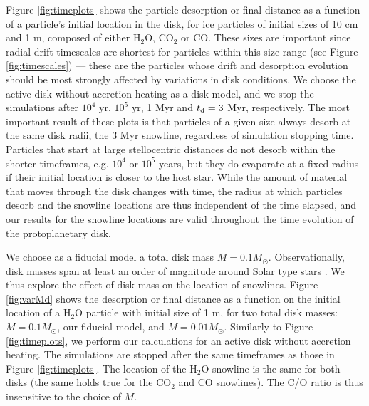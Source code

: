 \documentclass[apj]{emulateapj}
\begin{document}
Figure \ref{fig:timeplots} shows the particle desorption or final distance as a function of a particle's initial location in the disk, for ice particles %
of initial sizes of 10 cm and 1 m, composed of either H$_2$O, CO$_2$ or CO. These sizes are important since radial drift timescales are shortest for particles within this size range (see Figure \ref{fig:timescales}) --- these are the particles whose drift and desorption evolution should be most strongly affected by variations in disk conditions. We choose the active disk without accretion heating as a disk model, and we stop the simulations after $10^4$ yr, $10^5$ yr, 1 Myr and $t_{\rm d}=3$ Myr, respectively. %
The most important result of these plots is that particles of a given size always desorb at the same disk radii, the 3 Myr snowline, regardless of simulation stopping time.  Particles %
that start at large stellocentric distances do not desorb within the shorter timeframes, e.g. $10^4$ or $10^5$ years, but they do evaporate at a fixed radius if their initial location is closer to the host star. While the amount of material that moves through the disk changes with time, the radius at which particles desorb and 
the snowline locations are thus independent of the time elapsed, and %
our results for the snowline locations are %
valid throughout the time evolution of the protoplanetary disk. 

We choose as a fiducial model a total disk mass $M=0.1 M_{\odot}$. Observationally, disk masses span at least an order of magnitude around Solar type stars %
\citep{andrews13}. %
We thus explore the effect of disk mass on the location of snowlines. Figure \ref{fig:varMd} shows the desorption or final distance as a function on the initial location of a H$_2$O particle with initial size of 1 m, for two total disk masses: $M=0.1 M_{\odot}$, our fiducial model, and $M=0.01 M_{\odot}$. Similarly to Figure \ref{fig:timeplots}, we perform our calculations for an active disk without accretion heating. The simulations are stopped after the same timeframes as those in Figure \ref{fig:timeplots}. The location of the H$_2$O snowline is the same for both disks (the same holds true for the CO$_2$ and CO snowlines). The C/O ratio is thus insensitive to the choice of $M$. %
\end{document}
